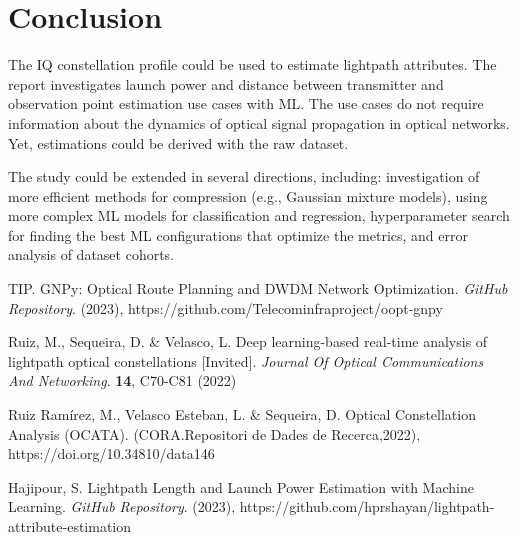 \documentclass[lettersize,journal, one-column]{IEEEtran}
\begin{document}
\section{Conclusion}
\label{section:conclusion}
The IQ constellation profile could be used to estimate lightpath attributes.
The report investigates launch power and distance between transmitter and observation point estimation use cases with ML.
The use cases do not require information about the dynamics of optical signal propagation in optical networks.
Yet, estimations could be derived with the raw dataset. 

The study could be extended in several directions, including: investigation of more efficient methods for compression (e.g., Gaussian mixture models), using more complex ML models for classification and regression, hyperparameter search for finding the best ML configurations that optimize the metrics, and error analysis of dataset cohorts.


\begin{thebibliography}{1}


TIP. GNPy: Optical Route Planning and DWDM Network Optimization. {\em GitHub Repository}. (2023), https://github.com/Telecominfraproject/oopt-gnpy

Ruiz, M., Sequeira, D. \& Velasco, L. Deep learning-based real-time analysis of lightpath optical constellations [Invited]. {\em Journal Of Optical Communications And Networking}. \textbf{14}, C70-C81 (2022)

Ruiz Ramírez, M., Velasco Esteban, L. \& Sequeira, D. Optical Constellation Analysis (OCATA). (CORA.Repositori de Dades de Recerca,2022), https://doi.org/10.34810/data146

Hajipour, S. Lightpath Length and Launch Power Estimation with Machine Learning. {\em GitHub Repository}. (2023), https://github.com/hprshayan/lightpath-attribute-estimation




\end{thebibliography}
\end{document}
